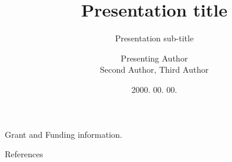 \documentclass[aspectratio=169,12pt]{beamer}
\title{Presentation title}
\subtitle{Presentation sub-title}
\author{Presenting Author\texorpdfstring{\\}{,}
  \small Second Author, Third Author}
\institute{Department, \texorpdfstring{\\}{}
  Institute}
\date{2000. 00. 00.}
\begin{document}
\AtBeginSection[]{}

\AtBeginSubsection[]{}


\begin{frame}
    \maketitle

    {%

    {\tiny%
      Grant and Funding information.
    }%

    }
\end{frame}

\begin{frame}[noframenumbering]
    \tableofcontents
\end{frame}


\begin{frame}{References}
    \printbibliography
\end{frame}
\end{document}
